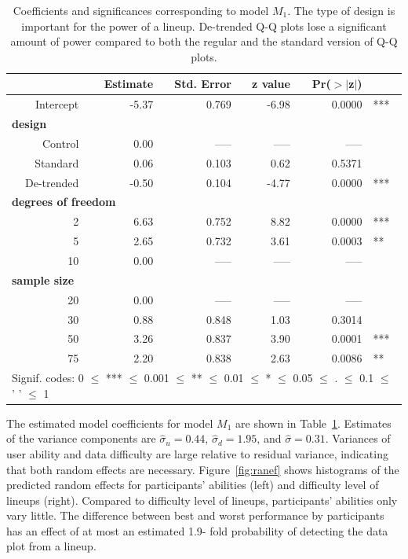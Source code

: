 \documentclass{article}\usepackage[]{graphicx}\usepackage[]{color}
\begin{document}
\begin{table}[ht]
\centering
\caption{\label{tab:model} Coefficients and significances corresponding to  model $M_1$. The type of design is important for the power of a lineup. De-trended Q-Q plots lose a significant amount of power compared to both the regular and the standard version of Q-Q plots. }
\begin{tabular}{rrrrrl}
  \hline
 &\bf Estimate &\bf Std. Error &\bf z value &\bf Pr($>$$|$z$|$) & \\ 
  \hline
  Intercept &  -5.37 & 0.769 & -6.98 & 0.0000  & *** \\ [3pt]
\multicolumn{3}{l}{\bf design} \\
   Control & 0.00 & ----- & ----- & ----- \\ 
   Standard & 0.06 & 0.103 & 0.62 & 0.5371 \\
   De-trended & -0.50 & 0.104 & -4.77 & 0.0000 & ***\\  [3pt]
\multicolumn{4}{l}{\bf degrees of freedom} \\
  2 & 6.63 & 0.752 & 8.82 & 0.0000 & ***\\ 
  5 & 2.65 & 0.732 & 3.61 & 0.0003 & **\\ 
  10 & 0.00 & ----- & ----- & ----- \\ [3pt]
\multicolumn{3}{l}{\bf sample size} \\
  20 & 0.00 & ----- & ----- & ----- \\ 
  30 & 0.88 & 0.848 & 1.03 & 0.3014 \\ 
  50  & 3.26 & 0.837 & 3.90 & 0.0001 & ***\\ 
  75 & 2.20 & 0.838 & 2.63 & 0.0086  & **\\ 
   \hline
\multicolumn{6}{l}{Signif. codes:  0 $\le$ *** $\le$ 0.001 $\le$ ** $\le$ 0.01 $\le$ * $\le$ 0.05 $\le$ . $\le$ 0.1 $\le$ ' ' $\le$ 1}
\end{tabular}
\end{table}

The estimated model coefficients for model $M_1$ are shown in Table~\ref{tab:model}. 
Estimates of the variance components are $\widehat{\sigma}_u = 0.44$, $\widehat{\sigma}_d=1.95$, and $\widehat{\sigma} = 0.31$. Variances of user ability and data difficulty are large relative to residual variance, indicating that both random effects are necessary.
%
Figure~\ref{fig:ranef} shows histograms of the predicted random effects for participants' abilities (left) and difficulty level of lineups (right). Compared to difficulty level of lineups, participants' abilities only vary little. The difference between best and worst performance by participants has an effect of at most an estimated 
1.9-
fold probability of detecting the data plot from a lineup. 
\end{document}
